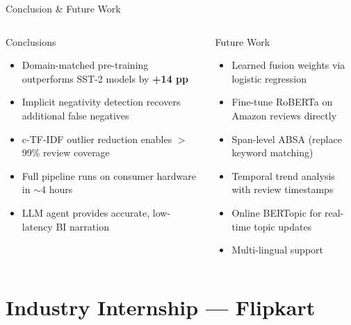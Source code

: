 \documentclass[aspectratio=169,xcolor=dvipsnames,10pt]{beamer}
\begin{document}
\begin{frame}{Conclusion \& Future Work}
    \begin{columns}[T]
        \begin{block}{Conclusions}
            \footnotesize
            \begin{itemize}
                \item Domain-matched pre-training outperforms SST-2 models by \textbf{+14 pp}
                \item Implicit negativity detection recovers additional false negatives
                \item c-TF-IDF outlier reduction enables $>$99\% review coverage
                \item Full pipeline runs on consumer hardware in $\sim$4 hours
                \item LLM agent provides accurate, low-latency BI narration
            \end{itemize}
        \end{block}

        \begin{alertblock}{Future Work}
            \footnotesize
            \begin{itemize}
                \item Learned fusion weights via logistic regression
                \item Fine-tune RoBERTa on Amazon reviews directly
                \item Span-level ABSA (replace keyword matching)
                \item Temporal trend analysis with review timestamps
                \item Online BERTopic for real-time topic updates
                \item Multi-lingual support
            \end{itemize}
        \end{alertblock}
    \end{columns}
\end{frame}

\section{Industry Internship --- Flipkart}
\end{document}
